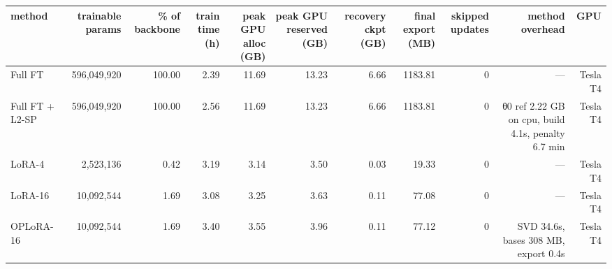 \begin{tabular}{lrrrrrrrrrr}
\toprule
method & trainable params & \% of backbone & train time (h) & peak GPU alloc (GB) & peak GPU reserved (GB) & recovery ckpt (GB) & final export (MB) & skipped updates & method overhead & GPU \\
\midrule
Full FT & 596,049,920 & 100.00 & 2.39 & 11.69 & 13.23 & 6.66 & 1183.81 & 0 & — & Tesla T4 \\
Full FT + L2-SP & 596,049,920 & 100.00 & 2.56 & 11.69 & 13.23 & 6.66 & 1183.81 & 0 & θ0 ref 2.22 GB on cpu, build 4.1s, penalty 6.7 min & Tesla T4 \\
LoRA-4 & 2,523,136 & 0.42 & 3.19 & 3.14 & 3.50 & 0.03 & 19.33 & 0 & — & Tesla T4 \\
LoRA-16 & 10,092,544 & 1.69 & 3.08 & 3.25 & 3.63 & 0.11 & 77.08 & 0 & — & Tesla T4 \\
OPLoRA-16 & 10,092,544 & 1.69 & 3.40 & 3.55 & 3.96 & 0.11 & 77.12 & 0 & SVD 34.6s, bases 308 MB, export 0.4s & Tesla T4 \\
\bottomrule
\end{tabular}
